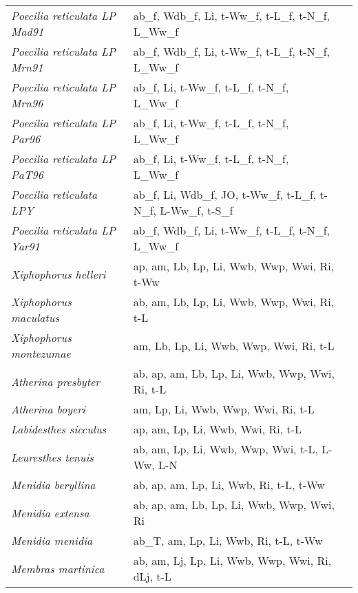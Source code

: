 {\begin{longtable}[c]{p{3.5cm}p{5.5cm}p{5.5cm}}
\emph{Poecilia reticulata LP Mad91} &  ab\_f, Wdb\_f, Li, t-Ww\_f, t-L\_f, t-N\_f, L\_Ww\_f & \citet{ReznBrya1996} \\
\emph{Poecilia reticulata LP Mrn91} &  ab\_f, Wdb\_f, Li, t-Ww\_f, t-L\_f, t-N\_f, L\_Ww\_f & \citet{ReznBrya1996} \\
\emph{Poecilia reticulata LP Mrn96} &  ab\_f, Li, t-Ww\_f, t-L\_f, t-N\_f, L\_Ww\_f & \citet{Rezn1996} \\
\emph{Poecilia reticulata LP Par96} &  ab\_f, Li, t-Ww\_f, t-L\_f, t-N\_f, L\_Ww\_f & \citet{Rezn1996} \\
\emph{Poecilia reticulata LP PaT96} &  ab\_f, Li, t-Ww\_f, t-L\_f, t-N\_f, L\_Ww\_f & \citet{Rezn1996} \\
\emph{Poecilia reticulata LPY} &  ab\_f, Li, Wdb\_f, JO, t-Ww\_f, t-L\_f, t-N\_f, L-Ww\_f, t-S\_f & \citet{ReznBrya2004,AuerDick2018} \\
\emph{Poecilia reticulata LP Yar91} &  ab\_f, Wdb\_f, Li, t-Ww\_f, t-L\_f, t-N\_f, L\_Ww\_f & \citet{ReznBrya1996} \\
\emph{Xiphophorus helleri} &  ap, am, Lb, Lp, Li, Wwb, Wwp, Wwi, Ri, t-Ww & \citet{MoshEagd2015,JameSamp2003} \\
\emph{Xiphophorus maculatus} &  ab, am, Lb, Lp, Li, Wwb, Wwp, Wwi, Ri, t-L & \citet{MoshEagd2015,Feli1951} \\
\emph{Xiphophorus montezumae} &  am, Lb, Lp, Li, Wwb, Wwp, Wwi, Ri, t-L & \citet{MoshEagd2015,KrueRose2011} \\
\emph{Atherina presbyter} &  ab, ap, am, Lb, Lp, Li, Wwb, Wwp, Wwi, Ri, t-L & \citet{PalmCull2006,TurnBamb1981,PajuLore2000,MoreMora2003} \\
\emph{Atherina boyeri} &  am, Lp, Li, Wwb, Wwp, Wwi, Ri, t-L & \citet{DulcGrub2008,PajuLore2000,LeonSini2000} \\
\emph{Labidesthes sicculus} &  ap, am, Lp, Li, Wwb, Wwi, Ri, t-L & \citet{PowlSand2008} \\
\emph{Leuresthes tenuis} &  ab, am, Lp, Li, Wwb, Wwp, Wwi, t-L, L-Ww, L-N & \citet{Clar1925} \\
\emph{Menidia beryllina} &  ab, ap, am, Lp, Li, Wwb, Ri, t-L, t-Ww & \citet{LetcBeng1993,ConoRoss1982,HubeBeng1999,EPA2002} \\
\emph{Menidia extensa} &  ab, ap, am, Lb, Lp, Li, Wwb, Wwp, Wwi, Ri & \citet{Anon2001,EPA2002} \\
\emph{Menidia menidia} &  ab\_T, am, Lp, Li, Wwb, Ri, t-L, t-Ww & \citet{BengBark1987,ConoRoss1982} \\
\emph{Membras martinica} &  ab, am, Lj, Lp, Li, Wwb, Wwp, Wwi, Ri, dLj, t-L & \citet{MartDrew1978} \\

\end{longtable}}

